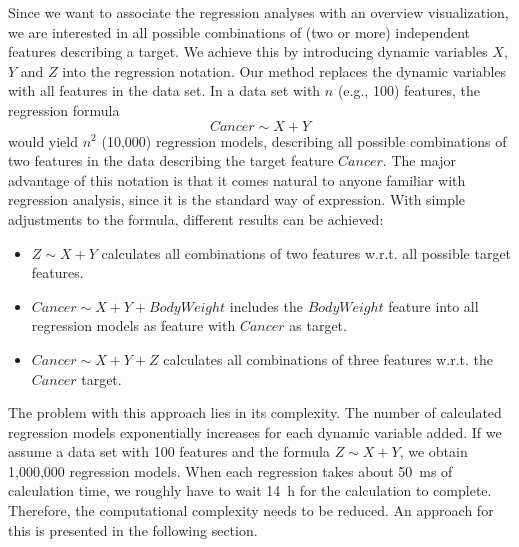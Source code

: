 \documentclass[journal]{style/vgtc} 			          %
\begin{document}
Since we want to associate the regression analyses with an overview visualization, we are interested in all possible combinations of (two or more) independent features describing a target.
We achieve this by introducing dynamic variables $X$, $Y$ and $Z$ into the regression notation.
Our method replaces the dynamic variables with all features in the data set.
In a data set with $n$ (e.g., 100) features, the regression formula
\begin{equation}
Cancer \sim X + Y
\end{equation}
would yield $n^2$ (10,000) regression models, describing all possible combinations of two features in the data describing the target feature $Cancer$.
The major advantage of this notation is that it comes natural to anyone familiar with regression analysis, since it is the standard way of expression.
With simple adjustments to the formula, different results can be achieved:
\begin{itemize}
	\item $Z \sim X + Y$ calculates all combinations of two features w.r.t. all possible target features.
	\item $Cancer \sim X + Y + BodyWeight$ includes the $BodyWeight$ feature into all regression models as feature with $Cancer$ as target.
	\item $Cancer \sim X + Y + Z$ calculates all combinations of three features w.r.t. the $Cancer$ target.
\end{itemize}
The problem with this approach lies in its complexity.
The number of calculated regression models exponentially increases for each dynamic variable added.
If we assume a data set with 100 features and the formula $Z \sim X + Y$, we obtain 1,000,000 regression models.
When each regression takes about 50~ms of calculation time, we roughly have to wait 14~h for the calculation to complete.
Therefore, the computational complexity needs to be reduced.
An approach for this is presented in the following section.
\end{document}
